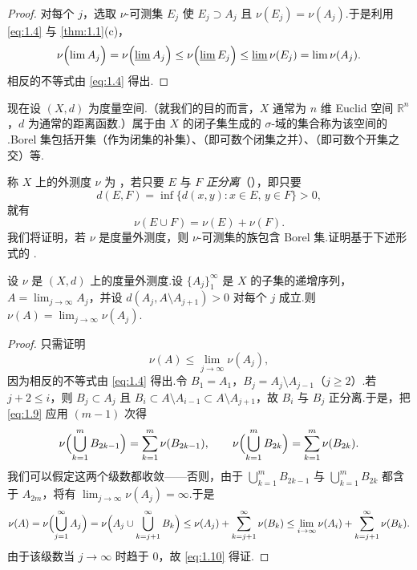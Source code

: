 \begin{proof}
对每个 $j$，选取 $\nu$-可测集 $E_j$ 使 $E_j\supset A_j$ 且 $\nu(E_j)=\nu(A_j)$.于是利用 \eqref{eq:1.4} 与 \cref{thm:1.1}(c)，
\[
  \nu\Bigl(\lim A_j\Bigr)=\nu\Bigl(\varliminf A_j\Bigr)\leq\nu\Bigl(\varliminf E_j\Bigr)\leq\varliminf\nu(E_j)=\lim\nu(A_j).
\]
相反的不等式由 \eqref{eq:1.4} 得出.
\end{proof}

现在设 $(X,d)$ 为度量空间.（就我们的目的而言，$X$ 通常为 $n$ 维 Euclid 空间 $\mathbb{R}^n$，$d$ 为通常的距离函数.）属于由 $X$ 的闭子集生成的 $\sigma$-域的集合称为该空间的 .Borel 集包括开集（作为闭集的补集）、（即可数个闭集之并）、（即可数个开集之交）等.

称 $X$ 上的外测度 $\nu$ 为 ，若只要 $E$ 与 $F$ \emph{正分离}（），即只要
\[
  d(E,F)=\inf\{d(x,y):x\in E,\,y\in F\}>0,
\]
就有
\begin{equation}\label{eq:1.9}
  \nu(E\cup F)=\nu(E)+\nu(F).
\end{equation}
我们将证明，若 $\nu$ 是度量外测度，则 $\nu$-可测集的族包含 Borel 集.证明基于下述形式的 .

\begin{lemma}\label{lem:1.4}
设 $\nu$ 是 $(X,d)$ 上的度量外测度.设 $\{A_j\}_{1}^{\infty}$ 是 $X$ 的子集的递增序列，$A=\lim_{j\to\infty}A_j$，并设 $d(A_j,A\setminus A_{j+1})>0$ 对每个 $j$ 成立.则 $\nu(A)=\lim_{j\to\infty}\nu(A_j)$.
\end{lemma}

\begin{proof}
只需证明
\begin{equation}\label{eq:1.10}
  \nu(A)\leq\lim_{j\to\infty}\nu(A_j),
\end{equation}
因为相反的不等式由 \eqref{eq:1.4} 得出.令 $B_1=A_1$，$B_j=A_j\setminus A_{j-1}$（$j\geq 2$）.若 $j+2\leq i$，则 $B_j\subset A_j$ 且 $B_i\subset A\setminus A_{i-1}\subset A\setminus A_{j+1}$，故 $B_i$ 与 $B_j$ 正分离.于是，把 \eqref{eq:1.9} 应用 $(m-1)$ 次得
\[
  \nu\Bigl(\bigcup_{k=1}^{m}B_{2k-1}\Bigr)=\sum_{k=1}^{m}\nu(B_{2k-1}),\qquad
  \nu\Bigl(\bigcup_{k=1}^{m}B_{2k}\Bigr)=\sum_{k=1}^{m}\nu(B_{2k}).
\]
我们可以假定这两个级数都收敛——否则，由于 $\bigcup_{k=1}^{m}B_{2k-1}$ 与 $\bigcup_{k=1}^{m}B_{2k}$ 都含于 $A_{2m}$，将有 $\lim_{j\to\infty}\nu(A_j)=\infty$.于是
\[
  \nu(A)=\nu\Bigl(\bigcup_{j=1}^{\infty}A_j\Bigr)
  =\nu\Bigl(A_j\cup\bigcup_{k=j+1}^{\infty}B_k\Bigr)
  \leq\nu(A_j)+\sum_{k=j+1}^{\infty}\nu(B_k)
  \leq\lim_{i\to\infty}\nu(A_i)+\sum_{k=j+1}^{\infty}\nu(B_k).
\]
由于该级数当 $j\to\infty$ 时趋于 $0$，故 \eqref{eq:1.10} 得证.
\end{proof}

